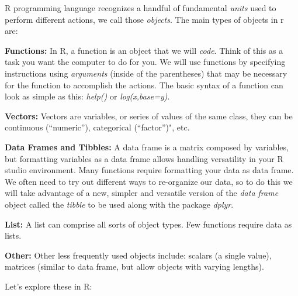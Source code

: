 \documentclass[]{article}
\begin{document}
R programming language recognizes a handful of fundamental \emph{units}
used to perform different actions, we call those \emph{objects}. The
main types of objects in r are:

\textbf{Functions:} In R, a function is an object that we will
\emph{code}. Think of this as a task you want the computer to do for
you. We will use functions by specifying instructions using
\emph{arguments} (inside of the parentheses) that may be necessary for
the function to accomplish the actions. The basic syntax of a function
can look as simple as this: \emph{help()} or \emph{log(x,base=y)}.

\textbf{Vectors:} Vectors are variables, or series of values of the same
class, they can be continuous (``numeric''), categorical (``factor'')",
etc.

\textbf{Data Frames and Tibbles:} A data frame is a matrix composed by
variables, but formatting variables as a data frame allows handling
versatility in your R studio environment. Many functions require
formatting your data as data frame. We often need to try out different
ways to re-organize our data, so to do this we will take advantage of a
new, simpler and versatile version of the \emph{data frame} object
called the \emph{tibble} to be used along with the package \emph{dplyr}.

\textbf{List:} A list can comprise all sorts of object types. Few
functions require data as lists.

\textbf{Other:} Other less frequently used objects include: scalars (a
single value), matrices (similar to data frame, but allow objects with
varying lengths).

Let's explore these in R:
\end{document}
